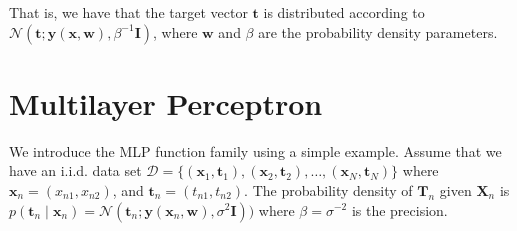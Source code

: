 \documentclass{tufte-handout}
\begin{document}
That is, we have that the target vector $\mathbf t$ is distributed according to  $\mathcal N(\mathbf t; \boldsymbol y(\mathbf x, \mathbf w), \beta^{-1}\mathbf I)$, where $\mathbf w$ and $\beta$ are the probability density parameters.



\vspace{-0\baselineskip}
\vspace{0\baselineskip}

\section{Multilayer Perceptron}

We introduce the MLP function family using a simple example. Assume that we have an i.i.d. data set
$\mathcal D = \{(\mathbf x_1, \mathbf t_1), (\mathbf x_2, \mathbf t_2), \dots, (\mathbf x_N, \mathbf t_N)\}$
where $\mathbf x_n = (x_{n1}, x_{n2}  )$, and $\mathbf t_n = (t_{n1}, t_{n2} )$.
The probability density of $\mathbf T_n$ given  $\mathbf X_n$ is $p(\mathbf t_n\mid \mathbf  x_n) =\mathcal N(\mathbf t_n; \mathbf y(\mathbf x_n, \mathbf w), \sigma^{2}\mathbf I))$ where $\beta = \sigma^{-2}$ is the precision.
\end{document}
